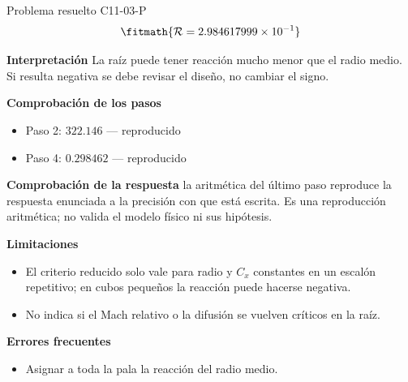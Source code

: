\documentclass[10pt,openany]{book}
\begin{document}
\begin{studiumworked}{Problema resuelto C11-03-P}
\[
\fitmath{\mathcal R=2.984617999\times10^{-1}}
\]

\noindent\textbf{Interpretación}
La raíz puede tener reacción mucho menor que el radio medio. Si resulta negativa se debe revisar el diseño, no cambiar el signo.

\noindent\textbf{Comprobación de los pasos}
\begin{itemize}
\item Paso 2: $322.146$ — reproducido
\item Paso 4: $0.298462$ — reproducido
\end{itemize}

\noindent\textbf{Comprobación de la respuesta} la aritmética del último paso reproduce la respuesta enunciada a la precisión con que está escrita. Es una reproducción aritmética; no valida el modelo físico ni sus hipótesis.

\noindent\textbf{Limitaciones}
\begin{itemize}
\item El criterio reducido solo vale para radio y $C_x$ constantes en un escalón repetitivo; en cubos pequeños la reacción puede hacerse negativa.
\item No indica si el Mach relativo o la difusión se vuelven críticos en la raíz.
\end{itemize}

\noindent\textbf{Errores frecuentes}
\begin{itemize}
\item Asignar a toda la pala la reacción del radio medio.
\end{itemize}
\end{studiumworked}
\end{document}
